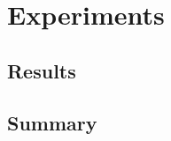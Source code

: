 \documentclass[thesis.tex]{subfiles}
\begin{document}
\chapter{Experiments} \label{experiments}


\section{Results} \label{results}


\section{Summary} \label{04summary}
\end{document}
